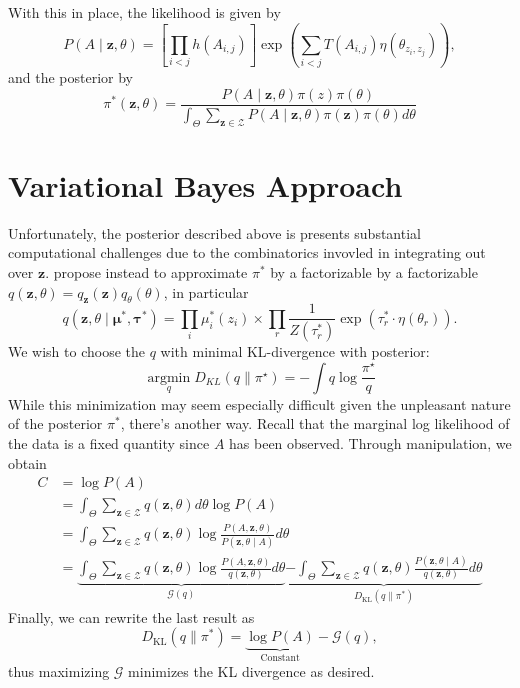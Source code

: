 \documentclass[11pt]{article}   %
\newcommand{\V}[1]{\ensuremath{\boldsymbol{#1}}}
\newcommand{\M}[1]{\ensuremath{#1}}
\begin{document}
With this in place, the likelihood is given by
\begin{equation*}
  P(A \mid \V{z}, \theta) = \left[ \prod_{i < j}  h(A_{i,j}) \right] \exp( \sum_{i < j} T(A_{i,j}) \eta(\theta_{z_i,z_j}) ),
\end{equation*}
and the posterior by
\begin{equation*}
  \pi^{*}(\V{z},\M{\theta}) = \frac{P(\M{A} \mid \V{z},\M{\theta}) \pi(z) \pi(\theta)}{\int_{\Theta} \sum_{\V{z} \in \mathcal{Z}} P(\M{A} \mid \V{z}, \M{\theta}) \pi(\V{z}) \pi(\M{\theta}) d \theta}
\end{equation*}



\section{Variational Bayes Approach}
\label{sec:vari-bayes-appr}
Unfortunately, the posterior described above is presents substantial computational challenges due to the combinatorics invovled in integrating out over $\V{z}$.
\textcite*{aicher_adapting_2013,aicher_learning_2015} propose instead to approximate $\pi^{*}$ by a factorizable by a factorizable $q(\V{z},\M{\theta}) = q_{\V{z}}(\V{z}) q_{\M{\theta}}(\M{\theta})$, in particular
\begin{equation*}
  q(\V{z}, \theta \mid \V{\mu^{*}}, \V{\tau^{*}}) = \prod_i \mu_i^{*}(z_i) \times \prod_r \frac{1}{Z(\tau_r^{*})} \exp( \tau_r^{*} \cdot \eta(\theta_r)).
\end{equation*}
We wish to choose the $q$ with minimal KL-divergence with posterior:
\begin{equation*}
  \operatorname*{argmin}_q D_{KL}(q \parallel \pi^{\star}) = - \int q \log \frac{\pi^{\star}}{q}
\end{equation*}
While this minimization may seem especially difficult given the unpleasant nature of the posterior $\pi^{*}$, there's another way.
Recall that the marginal log likelihood of the data is a fixed quantity since $A$ has been observed.
Through manipulation, we obtain
  \begin{align*}
    C &= \log P(A) \\
    &= \int_{\Theta} \sum_{\V{z} \in \mathcal{Z}} q(\V{z},\theta) d\theta \log P(A) \tag{Multiply by 1}\\
              &= \int_{\Theta} \sum_{\V{z} \in \mathcal{Z}} q(\V{z},\theta) \log \frac{P(A, \V{z}, \M{\theta})}{P(\V{z}, \M{\theta} \mid A)} d\theta \tag{Conditioning tricks}\\
              &= \underbrace{\int_{\Theta} \sum_{\V{z} \in \mathcal{Z}} q(\V{z},\theta) \log \frac{P(A, \V{z}, \M{\theta})}{q(\V{z}, \theta)} d\theta}_{\mathcal{G}(q)}  \underbrace{- \int_{\Theta} \sum_{\V{z} \in \mathcal{Z}} q(\V{z}, \theta) \frac{P(\V{z}, \M{\theta} \mid A)}{q(\V{z}, \theta)} d\theta}_{D_{\text{KL}}(q \parallel \pi^{*})}
  \end{align*}
  Finally, we can rewrite the last result as
  \begin{equation*}
  D_{\text{KL}}(q \parallel \pi^{*}) = \underbrace{\log P(A)}_{\text{Constant}} - \mathcal{G}(q),
\end{equation*}
thus maximizing $\mathcal{G}$ minimizes the KL divergence as desired.
\end{document}
